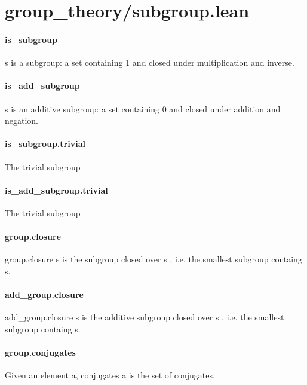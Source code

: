 \documentclass{article}
\begin{document}
\section{group\_theory/subgroup.lean}\paragraph{is\_subgroup}
\par
\colorbox[RGB]{253,246,227}{{{{\color[RGB]{101, 123, 131} s }}}} is a subgroup: a set containing 1 and closed under multiplication and inverse.
\paragraph{is\_add\_subgroup}
\par
\colorbox[RGB]{253,246,227}{{{{\color[RGB]{101, 123, 131} s }}}} is an additive subgroup: a set containing 0 and closed under addition and negation.
\paragraph{is\_subgroup.trivial}
\par
The trivial subgroup
\paragraph{is\_add\_subgroup.trivial}
\par
The trivial subgroup
\paragraph{group.closure}
\par
\colorbox[RGB]{253,246,227}{{{{\color[RGB]{101, 123, 131} group.closure s }}}} is the subgroup closed over 
\colorbox[RGB]{253,246,227}{{{{\color[RGB]{101, 123, 131} s }}}}, i.e. the smallest subgroup containg s.
\paragraph{add\_group.closure}
\par
\colorbox[RGB]{253,246,227}{{{{\color[RGB]{101, 123, 131} add\_group.closure s }}}} is the additive subgroup closed over 
\colorbox[RGB]{253,246,227}{{{{\color[RGB]{101, 123, 131} s }}}}, i.e. the smallest subgroup containg s.
\paragraph{group.conjugates}
\par
Given an element a, conjugates a is the set of conjugates.
\end{document}
